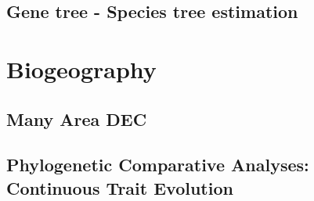 \documentclass[11pt]{book}
\begin{document}
\chapter{Gene tree - Species tree estimation}


\part{Biogeography}
\chapter{Many Area DEC}



\chapter{Phylogenetic Comparative Analyses: Continuous Trait Evolution}

\end{document}
